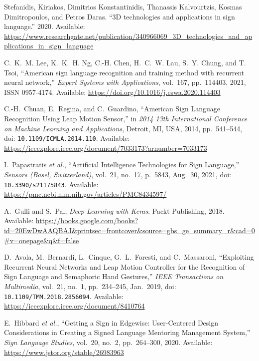 \documentclass[12pt]{article}
\begin{document}
\renewcommand{\refname}{Bibliography}

\begin{thebibliography}{99}

Stefanidis, Kiriakos, Dimitrios Konstantinidis, Thanassis Kalvourtzis,  
Kosmas Dimitropoulos, and Petros Daras.  
“3D technologies and applications in sign language.” 2020. 
Available: \url{https://www.researchgate.net/publication/340966069_3D_technologies_and_applications_in_sign_language}

C.~K.~M. Lee, K.~K.~H. Ng, C.-H. Chen, H.~C.~W. Lau, S.~Y. Chung, and T. Tsoi, 
“American sign language recognition and training method with recurrent neural network,” 
\textit{Expert Systems with Applications}, vol.~167, pp.~114403, 2021,  
ISSN 0957-4174.  
Available: \url{https://doi.org/10.1016/j.eswa.2020.114403} 

C.-H.~Chuan, E.~Regina, and C.~Guardino, 
“American Sign Language Recognition Using Leap Motion Sensor,” 
in \emph{2014 13th International Conference on Machine Learning and Applications}, 
Detroit, MI, USA, 2014, pp.~541–544, 
doi: \texttt{10.1109/ICMLA.2014.110}. 
Available: \url{https://ieeexplore.ieee.org/document/7033173?arnumber=7033173}

I.~Papastratis \emph{et al.}, 
“Artificial Intelligence Technologies for Sign Language,” 
\emph{Sensors (Basel, Switzerland)}, vol.~21, no.~17, p.~5843, Aug.~30, 2021, 
doi: \texttt{10.3390/s21175843}.   
Available: \url{https://pmc.ncbi.nlm.nih.gov/articles/PMC8434597/}

A.~Gulli and S.~Pal, 
\emph{Deep Learning with Keras}. 
Packt Publishing, 2018. 
Available: \url{https://books.google.com/books?id=20EwDwAAQBAJ&printsec=frontcover&source=gbs_ge_summary_r&cad=0#v=onepage&q&f=false}

D.~Avola, M.~Bernardi, L.~Cinque, G.~L.~Foresti, and C.~Massaroni, 
“Exploiting Recurrent Neural Networks and Leap Motion Controller for the Recognition of Sign Language and Semaphoric Hand Gestures,” 
\emph{IEEE Transactions on Multimedia}, vol.~21, no.~1, pp.~234--245, Jan.~2019, 
doi: \texttt{10.1109/TMM.2018.2856094}. 
Available: \url{https://ieeexplore.ieee.org/document/8410764}

E.~Hibbard \emph{et al.}, 
“Getting a Sign in Edgewise: User-Centered Design Considerations in Creating a Signed Language Mentoring Management System,” 
\emph{Sign Language Studies}, vol.~20, no.~2, pp.~264--300, 2020. 
Available: \url{https://www.jstor.org/stable/26983963}  


\end{thebibliography}
\end{document}
